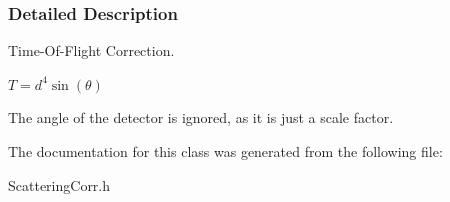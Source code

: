 \subsubsection{\-Detailed \-Description}
\-Time-\/\-Of-\/\-Flight \-Correction. 

$ T = d^4\sin(\theta) $

\-The  angle of the detector is ignored, as it is just a scale factor. 

\-The documentation for this class was generated from the following file\-:\begin{DoxyCompactItemize}
\item 
\-Scattering\-Corr.\-h\end{DoxyCompactItemize}
